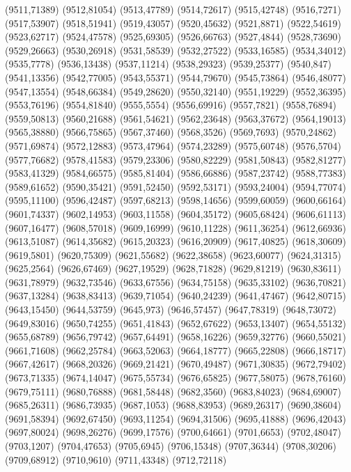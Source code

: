 (9511,71389)
(9512,81054)
(9513,47789)
(9514,72617)
(9515,42748)
(9516,7271)
(9517,53907)
(9518,51941)
(9519,43057)
(9520,45632)
(9521,8871)
(9522,54619)
(9523,62717)
(9524,47578)
(9525,69305)
(9526,66763)
(9527,4844)
(9528,73690)
(9529,26663)
(9530,26918)
(9531,58539)
(9532,27522)
(9533,16585)
(9534,34012)
(9535,7778)
(9536,13438)
(9537,11214)
(9538,29323)
(9539,25377)
(9540,847)
(9541,13356)
(9542,77005)
(9543,55371)
(9544,79670)
(9545,73864)
(9546,48077)
(9547,13554)
(9548,66384)
(9549,28620)
(9550,32140)
(9551,19229)
(9552,36395)
(9553,76196)
(9554,81840)
(9555,5554)
(9556,69916)
(9557,7821)
(9558,76894)
(9559,50813)
(9560,21688)
(9561,54621)
(9562,23648)
(9563,37672)
(9564,19013)
(9565,38880)
(9566,75865)
(9567,37460)
(9568,3526)
(9569,7693)
(9570,24862)
(9571,69874)
(9572,12883)
(9573,47964)
(9574,23289)
(9575,60748)
(9576,5704)
(9577,76682)
(9578,41583)
(9579,23306)
(9580,82229)
(9581,50843)
(9582,81277)
(9583,41329)
(9584,66575)
(9585,81404)
(9586,66886)
(9587,23742)
(9588,77383)
(9589,61652)
(9590,35421)
(9591,52450)
(9592,53171)
(9593,24004)
(9594,77074)
(9595,11100)
(9596,42487)
(9597,68213)
(9598,14656)
(9599,60059)
(9600,66164)
(9601,74337)
(9602,14953)
(9603,11558)
(9604,35172)
(9605,68424)
(9606,61113)
(9607,16477)
(9608,57018)
(9609,16999)
(9610,11228)
(9611,36254)
(9612,66936)
(9613,51087)
(9614,35682)
(9615,20323)
(9616,20909)
(9617,40825)
(9618,30609)
(9619,5801)
(9620,75309)
(9621,55682)
(9622,38658)
(9623,60077)
(9624,31315)
(9625,2564)
(9626,67469)
(9627,19529)
(9628,71828)
(9629,81219)
(9630,83611)
(9631,78979)
(9632,73546)
(9633,67556)
(9634,75158)
(9635,33102)
(9636,70821)
(9637,13284)
(9638,83413)
(9639,71054)
(9640,24239)
(9641,47467)
(9642,80715)
(9643,15450)
(9644,53759)
(9645,973)
(9646,57457)
(9647,78319)
(9648,73072)
(9649,83016)
(9650,74255)
(9651,41843)
(9652,67622)
(9653,13407)
(9654,55132)
(9655,68789)
(9656,79742)
(9657,64491)
(9658,16226)
(9659,32776)
(9660,55021)
(9661,71608)
(9662,25784)
(9663,52063)
(9664,18777)
(9665,22808)
(9666,18717)
(9667,42617)
(9668,20326)
(9669,21421)
(9670,49487)
(9671,30835)
(9672,79402)
(9673,71335)
(9674,14047)
(9675,55734)
(9676,65825)
(9677,58075)
(9678,76160)
(9679,75111)
(9680,76888)
(9681,58448)
(9682,3560)
(9683,84023)
(9684,69007)
(9685,26311)
(9686,73935)
(9687,1053)
(9688,83953)
(9689,26317)
(9690,38604)
(9691,58394)
(9692,67450)
(9693,11254)
(9694,31506)
(9695,41888)
(9696,42043)
(9697,80024)
(9698,26276)
(9699,17576)
(9700,64661)
(9701,6653)
(9702,48047)
(9703,1207)
(9704,47653)
(9705,6945)
(9706,15348)
(9707,36344)
(9708,30206)
(9709,68912)
(9710,9610)
(9711,43348)
(9712,72118)
